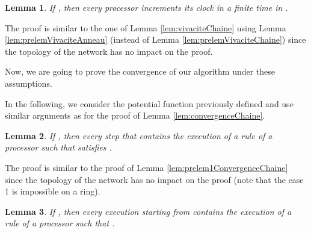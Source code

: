 \documentclass[11pt,english,letterpaper]{article}
\newtheorem{lemma}{Lemma}
\newenvironment{proof}{{\noindent\bf Proof. } }{{\hfill }}
\begin{document}
\begin{lemma}\label{lem:vivaciteAnneau}
If , then every processor increments its clock in a finite time in .
\end{lemma}

\begin{proof}
The proof is similar to the one of Lemma \ref{lem:vivaciteChaine} using Lemma \ref{lem:prelemVivaciteAnneau} (instead of Lemma \ref{lem:prelemVivaciteChaine}) since the topology of the network has no impact on the proof.
\end{proof}
		
Now, we are going to prove the convergence of our algorithm under these assumptions.

In the following, we consider the potential function  previously defined and use similar arguments as for the proof of Lemma \ref{lem:convergenceChaine}.

\begin{lemma}\label{lem:prelem1ConvergenceAnneau}
If , then every step  that contains the execution of a rule of a processor  such that  satisfies .
\end{lemma}

\begin{proof}
The proof is similar to the proof of Lemma \ref{lem:prelem1ConvergenceChaine} since the topology of the network has no impact on the proof (note that the case 1 is impossible on a ring).
\end{proof}

\begin{lemma}\label{lem:prelem2ConvergenceAnneau}
If , then every execution starting from  contains the execution of a rule of a processor  such that .
\end{lemma}
\end{document}
